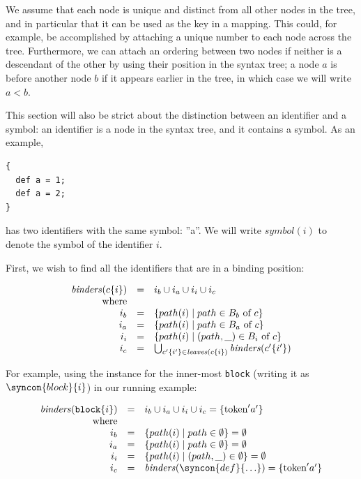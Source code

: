 \documentclass{kththesis}
\begin{document}
We assume that each node is unique and distinct from all other nodes in the tree, and in particular that it can be used as the key in a mapping. This could, for example, be accomplished by attaching a unique number to each node across the tree. Furthermore, we can attach an ordering between two nodes if neither is a descendant of the other by using their position in the syntax tree; a node $a$ is before another node $b$ if it appears earlier in the tree, in which case we will write $a < b$.


This section will also be strict about the distinction between an identifier and a symbol: an identifier is a node in the syntax tree, and it contains a symbol. As an example,

\begin{verbatim}
{
  def a = 1;
  def a = 2;
}
\end{verbatim}

\newcommand{\sym}{\ensuremath{\mathit{symbol}}}

has two identifiers with the same symbol: ''a''. We will write $\sym(i)$ to denote the symbol of the identifier $i$.

First, we wish to find all the identifiers that are in a binding position:

\newcommand{\binders}{\ensuremath{\mathit{binders}}}

$$
\begin{array}{rcl}
\binders(c\{i\}) & = & i_b \cup i_a \cup i_i \cup i_c \\
\text{where} & & \\
i_b & = & \{ path(i) \mid path \in B_b \text{ of } c\} \\
i_a & = & \{ path(i) \mid path \in B_a \text{ of } c\} \\
i_i & = & \{ path(i) \mid (path, \_) \in B_i \text{ of } c\} \\
i_c & = & \bigcup_{c'\{i'\} \in \leaves(c\{i\})} \binders(c'\{i'\}) \\
\end{array}
$$

For example, using the instance for the inner-most \texttt{block} (writing it as $\syncon{block}\{i\}$) in our running example:

$$
\begin{array}{rcl}
\binders(\text{\texttt{block}}\{i\}) & = & i_b \cup i_a \cup i_i \cup i_c = \{\text{token}'a'\}\\
\text{where} & & \\
i_b & = & \{ path(i) \mid path \in \emptyset \} = \emptyset \\
i_a & = & \{ path(i) \mid path \in \emptyset \} = \emptyset \\
i_i & = & \{ path(i) \mid (path, \_) \in \emptyset \} = \emptyset \\
i_c & = & \binders(\syncon{def}\{\ldots\}) = \{\text{token}'a'\} \\
\end{array}
$$
\end{document}
